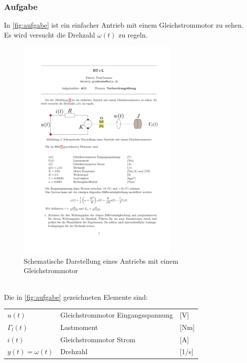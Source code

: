 \subsubsection*{Aufgabe}
\begin{aufgabe}
    In \autoref{fig:aufgabe} ist ein einfacher Antrieb mit einem 
    Gleichstrommotor zu sehen. Es wird versucht die Drehzahl $\omega(t)$ zu 
    regeln.
    \begin{figure}[h!]
        \centering
        \includegraphics[page=1, width=0.7\textwidth, trim=70 470 50 250, clip=true]
            {aufgabe/RTL_VorbereitungUebung.pdf}
        \caption{Schematische Darstellung eines Antriebs mit einem Gleichstrommotor}
        \label{fig:aufgabe}
    \end{figure}
    \\
    Die in \autoref{fig:aufgabe} gezeichneten Elemente sind: \\
    \begin{tabular}{@{}lll}
        $u(t)$              & Gleichstrommotor Eingangsspannung & [V] \\
        $\Gamma_l(t)$       & Lastmoment                        & [Nm] \\
        $i(t)$              & Gleichstrommotor Strom            & [A] \\
        $y(t) = \omega(t)$  & Drehzahl                          & [1/s] \\

\end{tabular}
\end{aufgabe}
